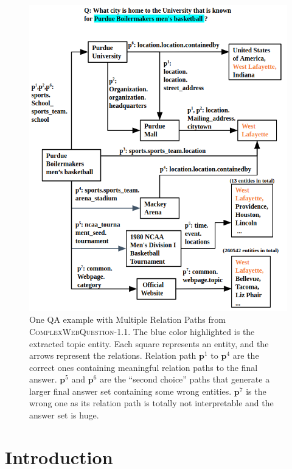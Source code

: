 \begin{figure}[t]
 \centering
 \includegraphics[width=1\linewidth]{figs/fig1.png}
 \caption{One QA example with Multiple Relation Paths from \textsc{ComplexWebQuestion}-1.1. The blue color highlighted is the extracted topic entity. Each square represents an entity, and the arrows represent the relations. Relation path $\mathbf{p}^1$ to $\mathbf{p}^4$ are the correct ones containing meaningful relation paths to the final answer. $\mathbf{p}^5$ and $\mathbf{p}^6$ are the ``second choice'' paths that generate a larger final answer set containing some wrong entities. $\mathbf{p}^7$ is the wrong one as its relation path is totally not interpretable and the answer set is huge.}
 \label{QAPaths}
\end{figure}

\section{Introduction}

